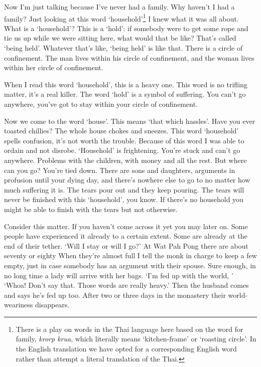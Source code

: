Now I'm just talking because I've never had a family. Why haven't I had a family? Just looking at this word `household'\footnote{There is a play on words in the Thai language here based on the word for family, \textit{krorp krua}, which literally means `kitchen-frame' or `roasting circle'. In the English translation we have opted for a corresponding English word rather than attempt a literal translation of the Thai.} I knew what it was all about. What is a `household'? This is a `hold': if somebody were to get some rope and tie us up while we were sitting here, what would that be like? That's called `being held'. Whatever that's like, `being held' is like that. There is a circle of confinement. The man lives within his circle of confinement, and the woman lives within her circle of confinement. 

When I read this word `household', this is a heavy one. This word is no trifling matter, it's a real killer. The word `hold' is a symbol of suffering. You can't go anywhere, you've got to stay within your circle of confinement. 

Now we come to the word `house'. This means `that which hassles'. Have you ever toasted chillies? The whole house chokes and sneezes. This word `household' spells confusion, it's not worth the trouble. Because of this word I was able to ordain and not disrobe. `Household' is frightening. You're stuck and can't go anywhere. Problems with the children, with money and all the rest. But where can you go? You're tied down. There are sons and daughters, arguments in profusion until your dying day, and there's nowhere else to go to no matter how much suffering it is. The tears pour out and they keep pouring. The tears will never be finished with this `household', you know. If there's no household you might be able to finish with the tears but not otherwise. 

Consider this matter. If you haven't come across it yet you may later on. Some people have experienced it already to a certain extent. Some are already at the end of their tether. `Will I stay or will I go?' At Wat Pah Pong there are about seventy or eighty  When they're almost full I tell the monk in charge to keep a few empty, just in case somebody has an argument with their spouse. Sure enough, in no long time a lady will arrive with her bags. `I'm fed up with the world, ' `Whoa! Don't say that. Those words are really heavy.' Then the husband comes and says he's fed up too. After two or three days in the monastery their world-weariness disappears. 

